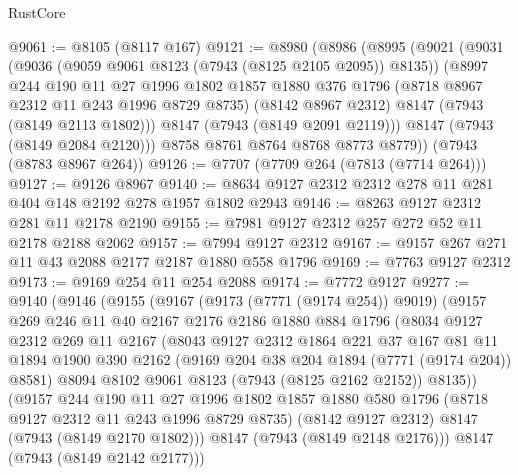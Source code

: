 \begin{lexlean}{RustCore}
\begin{coremodule}
@9061 := @8105 (@8117 @167)
@9121 := @8980
    (@8986
      (@8995
        (@9021
          (@9031
            (@9036 (@9059 @9061 @8123 (@7943 (@8125 @2105 @2095)) @8135))
            (@8997
              @244
              @190
              @11
              @27
              @1996
              @1802
              @1857
              @1880
              @376
              @1796
              (@8718 @8967 @2312 @11 @243 @1996 @8729 @8735)
              (@8142 @8967 @2312)
              @8147
              (@7943 (@8149 @2113 @1802)))
            @8147
            (@7943 (@8149 @2091 @2119)))
          @8147
          (@7943 (@8149 @2084 @2120)))
        @8758
        @8761
        @8764
        @8768
        @8773
        @8779))
    (@7943 (@8783 @8967 @264))
@9126 := @7707 (@7709 @264 (@7813 (@7714 @264)))
@9127 := @9126 @8967
@9140 := @8634 @9127 @2312 @2312 @278 @11 @281 @404 @148 @2192 @278 @1957 @1802 @2943
@9146 := @8263 @9127 @2312 @281 @11 @2178 @2190
@9155 := @7981 @9127 @2312 @257 @272 @52 @11 @2178 @2188 @2062
@9157 := @7994 @9127 @2312
@9167 := @9157 @267 @271 @11 @43 @2088 @2177 @2187 @1880 @558 @1796
@9169 := @7763 @9127 @2312
@9173 := @9169 @254 @11 @254 @2088
@9174 := @7772 @9127
@9277 := @9140
    (@9146
      (@9155
        (@9167
          (@9173 (@7771 (@9174 @254)) @9019)
          (@9157
            @269
            @246
            @11
            @40
            @2167
            @2176
            @2186
            @1880
            @884
            @1796
            (@8034
              @9127
              @2312
              @269
              @11
              @2167
              (@8043
                @9127
                @2312
                @1864
                @221
                @37
                @167
                @81
                @11
                @1894
                @1900
                @390
                @2162
                (@9169 @204 @38 @204 @1894 (@7771 (@9174 @204)) @8581)
                @8094
                @8102
                @9061
                @8123
                (@7943 (@8125 @2162 @2152))
                @8135))
            (@9157
              @244
              @190
              @11
              @27
              @1996
              @1802
              @1857
              @1880
              @580
              @1796
              (@8718 @9127 @2312 @11 @243 @1996 @8729 @8735)
              (@8142 @9127 @2312)
              @8147
              (@7943 (@8149 @2170 @1802)))
            @8147
            (@7943 (@8149 @2148 @2176)))
          @8147
          (@7943 (@8149 @2142 @2177)))

\end{coremodule}
\end{lexlean}
